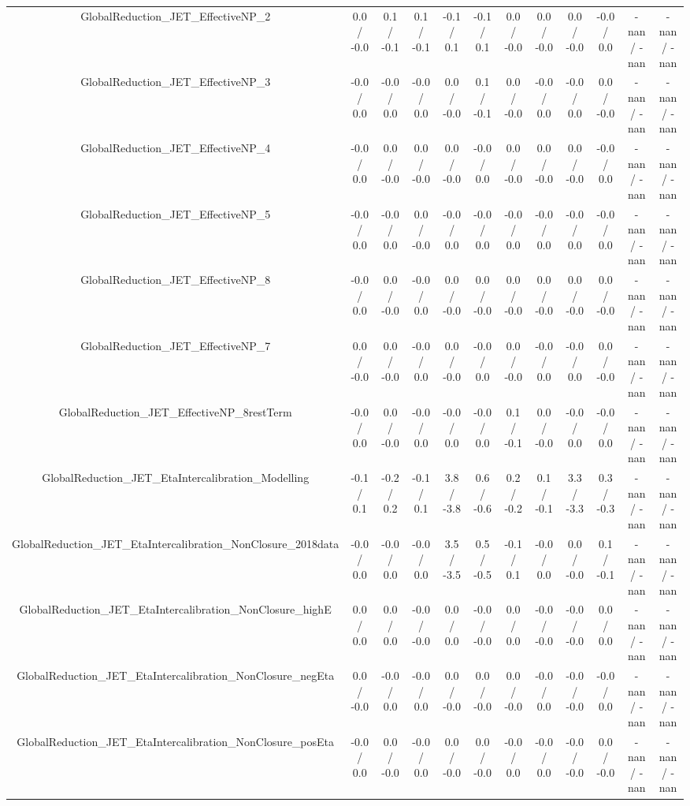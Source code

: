 \begin{table}[htbp]
\begin{center}
\begin{tabular}{|c|c|c|c|c|c|c|c|c|c|c|c|}
  GlobalReduction_JET_EffectiveNP_2 & 0.0 / -0.0 & 0.1 / -0.1 & 0.1 / -0.1 & -0.1 / 0.1 & -0.1 / 0.1 & 0.0 / -0.0 & 0.0 / -0.0 & 0.0 / -0.0 & -0.0 / 0.0 & -nan / -nan & -nan / -nan \\ 
  GlobalReduction_JET_EffectiveNP_3 & -0.0 / 0.0 & -0.0 / 0.0 & -0.0 / 0.0 & 0.0 / -0.0 & 0.1 / -0.1 & 0.0 / -0.0 & -0.0 / 0.0 & -0.0 / 0.0 & 0.0 / -0.0 & -nan / -nan & -nan / -nan \\ 
  GlobalReduction_JET_EffectiveNP_4 & -0.0 / 0.0 & 0.0 / -0.0 & 0.0 / -0.0 & 0.0 / -0.0 & -0.0 / 0.0 & 0.0 / -0.0 & 0.0 / -0.0 & 0.0 / -0.0 & -0.0 / 0.0 & -nan / -nan & -nan / -nan \\ 
  GlobalReduction_JET_EffectiveNP_5 & -0.0 / 0.0 & -0.0 / 0.0 & 0.0 / -0.0 & -0.0 / 0.0 & -0.0 / 0.0 & -0.0 / 0.0 & -0.0 / 0.0 & -0.0 / 0.0 & -0.0 / 0.0 & -nan / -nan & -nan / -nan \\ 
  GlobalReduction_JET_EffectiveNP_8 & -0.0 / 0.0 & 0.0 / -0.0 & -0.0 / 0.0 & 0.0 / -0.0 & 0.0 / -0.0 & 0.0 / -0.0 & 0.0 / -0.0 & 0.0 / -0.0 & 0.0 / -0.0 & -nan / -nan & -nan / -nan \\ 
  GlobalReduction_JET_EffectiveNP_7 & 0.0 / -0.0 & 0.0 / -0.0 & -0.0 / 0.0 & 0.0 / -0.0 & -0.0 / 0.0 & 0.0 / -0.0 & -0.0 / 0.0 & -0.0 / 0.0 & 0.0 / -0.0 & -nan / -nan & -nan / -nan \\ 
  GlobalReduction_JET_EffectiveNP_8restTerm & -0.0 / 0.0 & 0.0 / -0.0 & -0.0 / 0.0 & -0.0 / 0.0 & -0.0 / 0.0 & 0.1 / -0.1 & 0.0 / -0.0 & -0.0 / 0.0 & -0.0 / 0.0 & -nan / -nan & -nan / -nan \\ 
  GlobalReduction_JET_EtaIntercalibration_Modelling & -0.1 / 0.1 & -0.2 / 0.2 & -0.1 / 0.1 & 3.8 / -3.8 & 0.6 / -0.6 & 0.2 / -0.2 & 0.1 / -0.1 & 3.3 / -3.3 & 0.3 / -0.3 & -nan / -nan & -nan / -nan \\ 
  GlobalReduction_JET_EtaIntercalibration_NonClosure_2018data & -0.0 / 0.0 & -0.0 / 0.0 & -0.0 / 0.0 & 3.5 / -3.5 & 0.5 / -0.5 & -0.1 / 0.1 & -0.0 / 0.0 & 0.0 / -0.0 & 0.1 / -0.1 & -nan / -nan & -nan / -nan \\ 
  GlobalReduction_JET_EtaIntercalibration_NonClosure_highE & 0.0 / 0.0 & 0.0 / 0.0 & -0.0 / -0.0 & 0.0 / 0.0 & -0.0 / -0.0 & 0.0 / 0.0 & -0.0 / -0.0 & -0.0 / -0.0 & 0.0 / 0.0 & -nan / -nan & -nan / -nan \\ 
  GlobalReduction_JET_EtaIntercalibration_NonClosure_negEta & 0.0 / -0.0 & -0.0 / 0.0 & -0.0 / 0.0 & 0.0 / -0.0 & 0.0 / -0.0 & 0.0 / -0.0 & -0.0 / 0.0 & -0.0 / -0.0 & -0.0 / 0.0 & -nan / -nan & -nan / -nan \\ 
  GlobalReduction_JET_EtaIntercalibration_NonClosure_posEta & -0.0 / 0.0 & 0.0 / -0.0 & -0.0 / 0.0 & 0.0 / -0.0 & 0.0 / -0.0 & -0.0 / 0.0 & -0.0 / 0.0 & -0.0 / -0.0 & 0.0 / -0.0 & -nan / -nan & -nan / -nan \\ 

\end{tabular}
\end{center}
\end{table}
